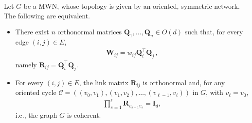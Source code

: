 \documentclass[10pt,a4paper]{amsart}
\begin{document}
\begin{prop}\label{prop:coherence}
Let $G$ be a MWN, whose topology is given by an oriented, symmetric network. The following are equivalent.
\begin{itemize}
    \item[(a)] There exist $n$ orthonormal matrices $\mathbf{Q}_1,\dots,\mathbf{Q}_n\in O(d)$ such that, for every edge $(i,j)\in E$,
    \begin{align}
        \mathbf{W}_{ij} = w_{ij}\mathbf{Q}_i^\top \mathbf{Q}_j\, ,
    \end{align}
    namely $\mathbf{R}_{ij}=\mathbf{Q}_i^\top \mathbf{Q}_j$.
    \item[(b)] For every $(i,j)\in E$, the link matrix $\mathbf{R}_{ij}$ is orthonormal and, for any oriented cycle 
    $\mathcal C=((v_0,v_1),(v_1,v_2),\dots,(v_{\ell-1},v_{\ell}))$ in $G$, with $v_{\ell}=v_0$,
    \begin{align}
        \prod_{s=1}^\ell \mathbf{R}_{v_{s-1}v_s} = \mathbf{I}_d,
    \end{align}
    i.e., the graph $G$ is coherent.
\end{itemize}
\end{prop}
\end{document}
